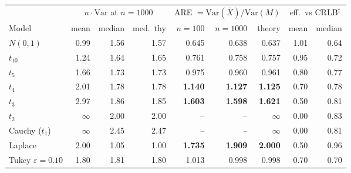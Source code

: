 \begin{tabular}{@{}lrrrrrrrr@{}}
\toprule
 & \multicolumn{3}{c}{$n\cdot\mathrm{Var}$ at $n{=}1000$} & \multicolumn{3}{c}{ARE $=\mathrm{Var}(\bar X)/\mathrm{Var}(M)$} & \multicolumn{2}{c}{eff.\ vs CRLB$^{\ddagger}$}\\
\cmidrule(lr){2-4}\cmidrule(lr){5-7}\cmidrule(l){8-9}
Model & mean & median & med.\ thy & $n{=}100$ & $n{=}1000$ & theory & mean & median\\
\midrule
$N(0,1)$ & 0.99 & 1.56 & 1.57 & 0.645 & 0.638 & 0.637 & 1.01 & 0.64\\
$t_{10}$ & 1.24 & 1.64 & 1.65 & 0.761 & 0.758 & 0.757 & 0.95 & 0.72\\
$t_{5}$ & 1.66 & 1.73 & 1.73 & 0.975 & 0.960 & 0.961 & 0.80 & 0.77\\
$t_{4}$ & 2.01 & 1.78 & 1.78 & \textbf{1.140} & \textbf{1.127} & \textbf{1.125} & 0.70 & 0.78\\
$t_{3}$ & 2.97 & 1.86 & 1.85 & \textbf{1.603} & \textbf{1.598} & \textbf{1.621} & 0.50 & 0.81\\
$t_{2}$ & $\infty$ & 2.00 & 2.00 & -- & -- & \textbf{$\infty$} & 0.00 & 0.83\\
Cauchy ($t_1$) & $\infty$ & 2.45 & 2.47 & -- & -- & \textbf{$\infty$} & 0.00 & 0.81\\
Laplace & 2.00 & 1.05 & 1.00 & \textbf{1.735} & \textbf{1.909} & \textbf{2.000} & 0.50 & 0.96\\
Tukey $\varepsilon{=}0.10$ & 1.80 & 1.81 & 1.80 & 1.013 & 0.998 & 0.998 & 0.70 & 0.70\\
\bottomrule
\end{tabular}
